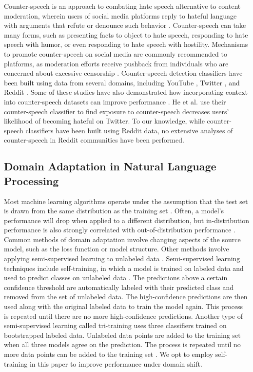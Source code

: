 \documentclass[10pt,twocolumn,letterpaper]{article}
\begin{document}
Counter-speech is an approach to combating hate speech alternative to content moderation, wherein users of social media platforms reply to hateful language with arguments that refute or denounce such behavior \cite{mathew2019thou}. Counter-speech can take many forms, such as presenting facts to object to hate speech, responding to hate speech with humor, or even responding to hate speech with hostility. Mechanisms to promote counter-speech on social media are commonly recommended to platforms, as moderation efforts receive pushback from individuals who are concerned about excessive censorship \cite{mathew2020hate}. Counter-speech detection classifiers have been built using data from several domains, including YouTube \cite{mathew2019thou}, Twitter \cite{he2021racism, albanyan2022pinpointing}, and Reddit \cite{yu-etal-2022-hate, vidgen-etal-2021-introducing}. Some of these studies have also demonstrated how incorporating context into counter-speech datasets can improve performance \cite{albanyan2022pinpointing, yu-etal-2022-hate}. He et al. \cite{he2021racism} use their counter-speech classifier to find exposure to counter-speech decreases users' likelihood of becoming hateful on Twitter. To our knowledge, while counter-speech classifiers have been built using Reddit data, no extensive analyses of counter-speech in Reddit communities have been performed.

\subsection{Domain Adaptation in Natural Language Processing}
Most machine learning algorithms operate under the assumption that the test set is drawn from the same distribution as the training set \cite{ramponi2020neural}. Often, a model's performance will drop when applied to a different distribution, but in-distribution performance is also strongly correlated with out-of-distribution performance \cite{miller2021accuracy}. Common methods of domain adaptation involve changing aspects of the source model, such as the loss function or model structure. Other methods involve applying semi-supervised learning to unlabeled data \cite{ramponi2020neural}. Semi-supervised learning techniques include self-training, in which a model is trained on labeled data and used to predict classes on unlabeled data \cite{ruder2018strong}. The predictions above a certain confidence threshold are automatically labeled with their predicted class and removed from the set of unlabeled data. The high-confidence predictions are then used along with the original labeled data to train the model again. This process is repeated until there are no more high-confidence predictions. Another type of semi-supervised learning called tri-training uses three classifiers trained on bootstrapped labeled data. Unlabeled data points are added to the training set when all three models agree on the prediction. The process is repeated until no more data points can be added to the training set \cite{ruder2018strong}. We opt to employ self-training in this paper to improve performance under domain shift.
\end{document}
